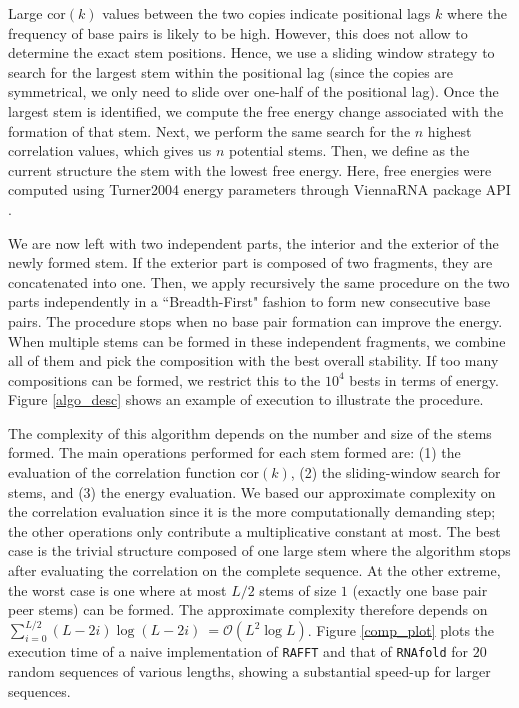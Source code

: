 Large \(\text{cor}(k)\) values between the two copies indicate positional lags \(k\) where the frequency of base pairs is likely to be high. However, this does not allow to determine the exact stem positions. Hence, we use a sliding window strategy to search for the largest stem within the positional lag (since the copies are symmetrical, we only need to slide over one-half of the positional lag). Once the largest stem is identified, we compute the free energy change associated with the formation of that stem. Next, we perform the same search for the \(n\) highest correlation values, which gives us \(n\) potential stems. Then, we define as the current structure the stem with the lowest free energy. Here, free energies were computed using Turner2004 energy parameters through ViennaRNA package API \cite{lorenz11_vienn_packag}.

We are now left with two independent parts, the interior and the exterior of the newly formed stem. If the exterior part is composed of two fragments, they are concatenated into one. Then, we apply recursively the same procedure on the two parts independently in a ``Breadth-First" fashion to form new consecutive base pairs. The procedure stops when no base pair formation can improve the energy. When multiple stems can be formed in these independent fragments, we combine all of them and pick the composition with the best overall stability. If too many compositions can be formed, we restrict this to the $10^4$ bests in terms of energy. Figure \ref{algo_desc} shows an example of execution to illustrate the procedure. 

The complexity of this algorithm depends on the number and size of the stems formed. The main operations performed for each stem formed are: (1) the evaluation of the correlation function \(\text{cor}(k)\), (2) the sliding-window search for stems, and (3) the energy evaluation. We based our approximate complexity on the correlation evaluation since it is the more computationally demanding step; the other operations only contribute a multiplicative constant at most. The best case is the trivial structure composed of one large stem where the algorithm stops after evaluating the correlation on the complete sequence. At the other extreme, the worst case is one where at most \(L/2\) stems of size $1$ (exactly one base pair peer stems) can be formed. The approximate complexity therefore depends on \(\sum_{i=0}^{L/2} (L-2i) \log(L-2i) \ = \mathcal{O}(L^2\log{L})\). Figure \ref{comp_plot} plots the execution time of a naive implementation of \texttt{RAFFT} and that of \texttt{RNAfold} for $20$ random sequences of various lengths, showing a substantial speed-up for larger sequences. 

